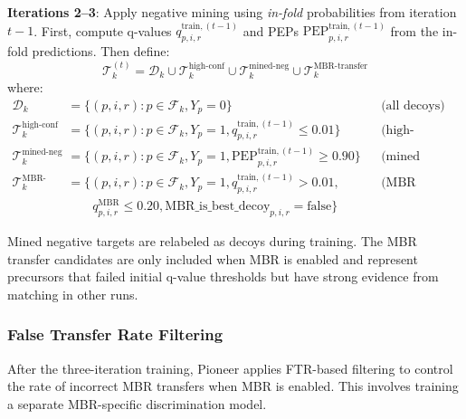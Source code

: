 \documentclass[pdflatex,sn-nature]{sn-jnl}
\begin{document}
\textbf{Iterations 2--3}: Apply negative mining using \emph{in-fold} probabilities from iteration $t-1$. First, compute q-values $q_{p,i,r}^{\text{train},(t-1)}$ and PEPs $\text{PEP}_{p,i,r}^{\text{train},(t-1)}$ from the in-fold predictions. Then define:
\begin{equation}
  \mathcal{T}_{k}^{(t)} = \mathcal{D}_k \cup \mathcal{T}_k^{\text{high-conf}} \cup \mathcal{T}_k^{\text{mined-neg}} \cup \mathcal{T}_k^{\text{MBR-transfer}}
\end{equation}
where:
\begin{align}
  \mathcal{D}_k &= \{(p,i,r) : p \in \mathcal{F}_{k}, Y_p = 0\} && \text{(all decoys)} \\
  \mathcal{T}_k^{\text{high-conf}} &= \{(p,i,r) : p \in \mathcal{F}_{k}, Y_p = 1, q_{p,i,r}^{\text{train},(t-1)} \leq 0.01\} && \text{(high-confidence targets)} \\
  \mathcal{T}_k^{\text{mined-neg}} &= \{(p,i,r) : p \in \mathcal{F}_{k}, Y_p = 1, \text{PEP}_{p,i,r}^{\text{train},(t-1)} \geq 0.90\} && \text{(mined negatives)} \\
  \mathcal{T}_k^{\text{MBR-transfer}} &= \{(p,i,r) : p \in \mathcal{F}_{k}, Y_p = 1, q_{p,i,r}^{\text{train},(t-1)} > 0.01, && \text{(MBR candidates)} \\
  & \qquad q_{p,i,r}^{\text{MBR}} \leq 0.20, \text{MBR\_is\_best\_decoy}_{p,i,r} = \text{false}\} &&
\end{align}

Mined negative targets are relabeled as decoys during training. The MBR transfer candidates are only included when MBR is enabled and represent precursors that failed initial q-value thresholds but have strong evidence from matching in other runs.

\subsubsection{False Transfer Rate Filtering}

After the three-iteration training, Pioneer applies FTR-based filtering to control the rate of incorrect MBR transfers when MBR is enabled. This involves training a separate MBR-specific discrimination model.
\end{document}
